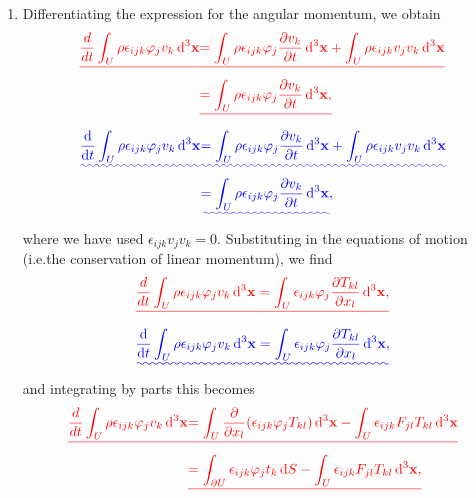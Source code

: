 \documentclass[a4paper,10pt]{paper}
\providecommand{\DIFadd}[1]{{\protect\color{blue}\uwave{#1}}} %
\providecommand{\DIFdel}[1]{{\protect\color{red}\sout{#1}}}                      %
\providecommand{\DIFaddbegin}{} %
\providecommand{\DIFaddend}{} %
\providecommand{\DIFdelbegin}{} %
\providecommand{\DIFdelend}{} %
\begin{document}
\begin{enumerate}
\begin{enumerate}
\item
Differentiating the expression for the angular momentum, we obtain
\DIFdelbegin \begin{eqnarray*}
    \DIFdel{\frac{d}{dt}\int_{U}\rho\epsilon_{ijk}\varphi_{j}v_{k}\dd^{3}\mathbf{x} }&\DIFdel{= \int_{U}\rho\epsilon_{ijk}\varphi_{j}\frac{\partial v_{k}}{\partial t}\dd^{3}\mathbf{x}+\int_{U}\rho\epsilon_{ijk}v_{j}v_{k}\dd^{3}\mathbf{x} }\\
    &\DIFdel{= \int_{U}\rho\epsilon_{ijk}\varphi_{j}\frac{\partial v_{k}}{\partial t}\dd^{3}\mathbf{x},
}\end{eqnarray*}%
\DIFdelend \DIFaddbegin \begin{align*}
    \DIFadd{\frac{\ddns}{\ddns t}\int_{U}\rho\epsilon_{ijk}\varphi_{j}v_{k}\dd^{3}\mathbf{x} }&\DIFadd{= \int_{U}\rho\epsilon_{ijk}\varphi_{j}\frac{\partial v_{k}}{\partial t}\dd^{3}\mathbf{x}+\int_{U}\rho\epsilon_{ijk}v_{j}v_{k}\dd^{3}\mathbf{x} }\\
    &\DIFadd{= \int_{U}\rho\epsilon_{ijk}\varphi_{j}\frac{\partial v_{k}}{\partial t}\dd^{3}\mathbf{x},
}\end{align*}\DIFaddend 
where we have used $\epsilon_{ijk}v_{j}v_{k}=0$. Substituting in the equations of motion (i.e.\DIFaddbegin \DIFadd{\ }\DIFaddend the conservation of linear momentum), we find
\DIFdelbegin \begin{displaymath}
    \DIFdel{\frac{d}{dt}\int_{U}\rho\epsilon_{ijk}\varphi_{j}v_{k}\dd^{3}\mathbf{x}=\int_{U}\epsilon_{ijk}\varphi_{j}\frac{\partial T_{kl}}{\partial x_{l}}\dd^{3}\mathbf{x},
}\end{displaymath}%
\DIFdelend \DIFaddbegin \begin{equation*}
    \DIFadd{\frac{\ddns}{\ddns t}\int_{U}\rho\epsilon_{ijk}\varphi_{j}v_{k}\dd^{3}\mathbf{x}=\int_{U}\epsilon_{ijk}\varphi_{j}\frac{\partial T_{kl}}{\partial x_{l}}\dd^{3}\mathbf{x},
}\end{equation*}\DIFaddend 
and integrating by parts this becomes
\DIFdelbegin \begin{eqnarray*}
    \DIFdel{\frac{d}{dt}\int_{U}\rho\epsilon_{ijk}\varphi_{j}v_{k}\dd^{3}\mathbf{x} }&\DIFdel{= \int_{U}\frac{\partial}{\partial x_{l}}(\epsilon_{ijk}\varphi_{j}T_{kl})\dd^{3}\mathbf{x}-\int_{U}\epsilon_{ijk}F_{jl}T_{kl}\dd^{3}\mathbf{x} }\\
    &\DIFdel{= \int_{\partial U}\epsilon_{ijk}\varphi_{j}t_{k}\dd S-\int_{U}\epsilon_{ijk}F_{jl}T_{kl}\dd^{3}\mathbf{x},
}\end{eqnarray*}%
\DIFdelend \DIFaddbegin \begin{align*}

\end{align*}
\end{enumerate}
\end{enumerate}
\end{document}
